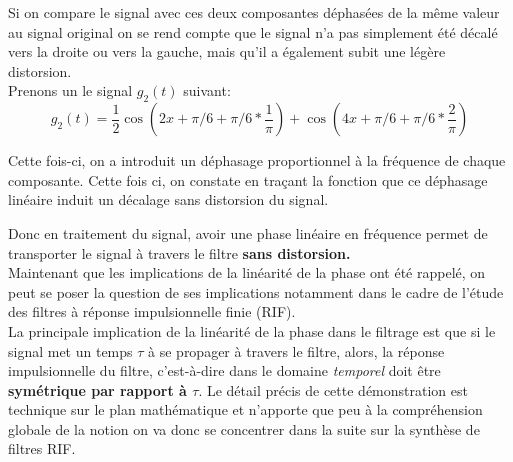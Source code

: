 \documentclass[11pt,a4paper]{article}
\begin{document}
Si on compare le signal avec ces deux composantes déphasées de la même valeur au signal original on se rend compte que le signal n'a pas simplement été décalé vers la droite ou vers la gauche, mais qu'il a également subit une légère distorsion.\\

Prenons un le signal $g_2(t)$ suivant: 
\[ g_2(t) = \frac{1}{2} \cos(2 x + \pi/6 + \pi/6*\frac{1}{\pi}) + \cos(4 x +  \pi/6 + \pi/6*\frac{2}{\pi})  \]

Cette fois-ci, on a introduit un déphasage proportionnel à la fréquence de chaque composante. Cette fois ci, on constate en traçant la fonction que ce déphasage linéaire induit un décalage sans distorsion du signal.

\begin{center}
\end{center}

Donc en traitement du signal, avoir une phase linéaire en fréquence permet de transporter le signal à travers le filtre \textbf{sans distorsion.}\\

Maintenant que les implications de la linéarité de la phase ont été rappelé, on peut se poser la question de ses implications notamment dans le cadre de l'étude des filtres à réponse impulsionnelle finie (RIF).\\

La principale implication de la linéarité de la phase dans le filtrage est que si le signal met un temps $\tau$ à se propager à travers le filtre, alors, la réponse impulsionnelle du filtre, c'est-à-dire dans le domaine \textit{temporel} doit être \textbf{symétrique par rapport à $\tau$}. Le détail précis de cette démonstration est technique sur le plan mathématique et n'apporte que peu à la compréhension globale de la notion on va donc se concentrer dans la suite sur la synthèse de filtres RIF.\\ 
\end{document}
